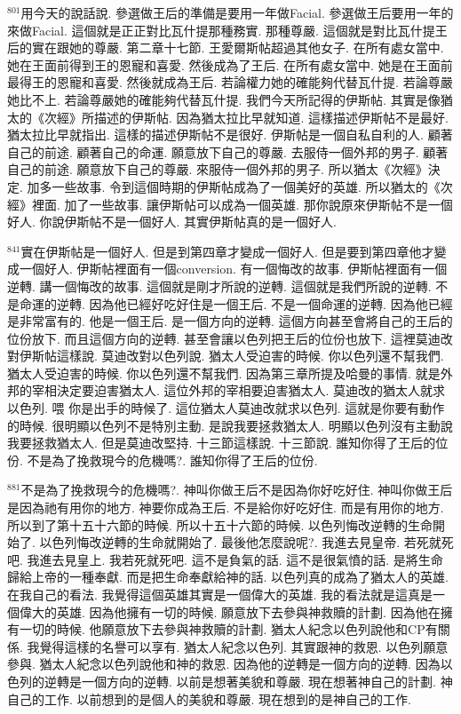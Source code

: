 \documentclass{book}
\begin{document}
$^{801}$用今天的說話說.
參選做王后的準備是要用一年做Facial.
參選做王后要用一年的來做Facial.
這個就是正正對比瓦什提那種務實.
那種尊嚴.
這個就是對比瓦什提王后的實在跟她的尊嚴.
第二章十七節.
王愛爾斯帖超過其他女子.
在所有處女當中.
她在王面前得到王的恩寵和喜愛.
然後成為了王后.
在所有處女當中.
她是在王面前最得王的恩寵和喜愛.
然後就成為王后.
若論權力她的確能夠代替瓦什提.
若論尊嚴她比不上.
若論尊嚴她的確能夠代替瓦什提.
我們今天所記得的伊斯帖.
其實是像猶太的《次經》所描述的伊斯帖.
因為猶太拉比早就知道.
這樣描述伊斯帖不是最好.
猶太拉比早就指出.
這樣的描述伊斯帖不是很好.
伊斯帖是一個自私自利的人.
顧著自己的前途.
顧著自己的命運.
願意放下自己的尊嚴.
去服侍一個外邦的男子.
顧著自己的前途.
願意放下自己的尊嚴.
來服侍一個外邦的男子.
所以猶太《次經》決定.
加多一些故事.
令到這個時期的伊斯帖成為了一個美好的英雄.
所以猶太的《次經》裡面.
加了一些故事.
讓伊斯帖可以成為一個英雄.
那你說原來伊斯帖不是一個好人.
你說伊斯帖不是一個好人.
其實伊斯帖真的是一個好人.

$^{841}$實在伊斯帖是一個好人.
但是到第四章才變成一個好人.
但是要到第四章他才變成一個好人.
伊斯帖裡面有一個conversion.
有一個悔改的故事.
伊斯帖裡面有一個逆轉.
講一個悔改的故事.
這個就是剛才所說的逆轉.
這個就是我們所說的逆轉.
不是命運的逆轉.
因為他已經好吃好住是一個王后.
不是一個命運的逆轉.
因為他已經是非常富有的.
他是一個王后.
是一個方向的逆轉.
這個方向甚至會將自己的王后的位份放下.
而且這個方向的逆轉.
甚至會讓以色列把王后的位份也放下.
這裡莫迪改對伊斯帖這樣說.
莫迪改對以色列說.
猶太人受迫害的時候.
你以色列還不幫我們.
猶太人受迫害的時候.
你以色列還不幫我們.
因為第三章所提及哈曼的事情.
就是外邦的宰相決定要迫害猶太人.
這位外邦的宰相要迫害猶太人.
莫迪改的猶太人就求以色列.
喂 你是出手的時候了.
這位猶太人莫迪改就求以色列.
這就是你要有動作的時候.
很明顯以色列不是特別主動.
是說我要拯救猶太人.
明顯以色列沒有主動說我要拯救猶太人.
但是莫迪改堅持.
十三節這樣說.
十三節說.
誰知你得了王后的位份.
不是為了挽救現今的危機嗎?.
誰知你得了王后的位份.

$^{881}$不是為了挽救現今的危機嗎?.
神叫你做王后不是因為你好吃好住.
神叫你做王后是因為祂有用你的地方.
神要你成為王后.
不是給你好吃好住.
而是有用你的地方.
所以到了第十五十六節的時候.
所以十五十六節的時候.
以色列悔改逆轉的生命開始了.
以色列悔改逆轉的生命就開始了.
最後他怎麼說呢?.
我進去見皇帝.
若死就死吧.
我進去見皇上.
我若死就死吧.
這不是負氣的話.
這不是很氣憤的話.
是將生命歸給上帝的一種奉獻.
而是把生命奉獻給神的話.
以色列真的成為了猶太人的英雄.
在我自己的看法.
我覺得這個英雄其實是一個偉大的英雄.
我的看法就是這真是一個偉大的英雄.
因為他擁有一切的時候.
願意放下去參與神救贖的計劃.
因為他在擁有一切的時候.
他願意放下去參與神救贖的計劃.
猶太人紀念以色列說他和CP有關係.
我覺得這樣的名譽可以享有.
猶太人紀念以色列.
其實跟神的救恩.
以色列願意參與.
猶太人紀念以色列說他和神的救恩.
因為他的逆轉是一個方向的逆轉.
因為以色列的逆轉是一個方向的逆轉.
以前是想著美貌和尊嚴.
現在想著神自己的計劃.
神自己的工作.
以前想到的是個人的美貌和尊嚴.
現在想到的是神自己的工作.
\end{document}
